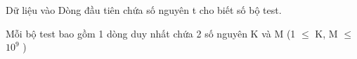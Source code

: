 Dữ liệu vào
Dòng đầu tiên chứa số nguyên t cho biết số bộ test.

Mỗi bộ test bao gồm 1 dòng duy nhất chứa 2 số nguyên K và M (1  $\le$  K, M  $\le$  $10^{9}$ )